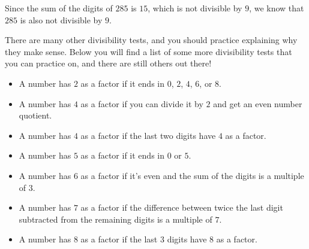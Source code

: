 \documentclass{ximera}
\begin{document}
\begin{example}
\begin{image}
\end{image}

Since the sum of the digits of $285$ is $15$, which is not divisible by $9$, we know that $285$ is also not divisible by $9$. 




\end{example}

There are many other divisibility tests, and you should practice explaining why they make sense. Below you will find a list of some more divisibility tests that you can practice on, and there are still others out there!
\begin{itemize}
\item A number has $2$ as a factor if it ends in $0$, $2$, $4$, $6$, or $8$.
\item A number has $4$ as a factor if you can divide it by $2$ and get an even number quotient.
\item A number has $4$ as a factor if the last two digits have $4$ as a factor.
\item A number has $5$ as a factor if it ends in $0$ or $5$.
\item A number has $6$ as a factor if it's even and the sum of the digits is a multiple of $3$.
\item A number has $7$ as a factor if the difference between twice the last digit subtracted from the remaining digits is a multiple of $7$.
\item A number has $8$ as a factor if the last $3$ digits have 8 as a factor.
\end{itemize}
\end{document}
